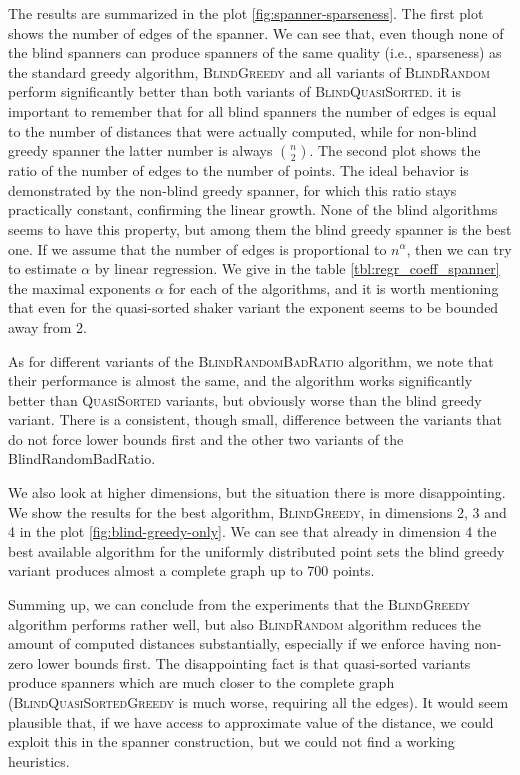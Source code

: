 \documentclass[a4paper,USenglish]{socg-lipics-v2018}
\begin{document}
The results are summarized in the plot \ref{fig:spanner-sparseness}.
The first plot shows the number of edges of the spanner.
We can see that, even though none of the blind spanners can produce
spanners of the same quality (i.e., sparseness) as the standard greedy algorithm,
\textsc{BlindGreedy} and all variants of \textsc{BlindRandom}
perform significantly better than both variants of \textsc{BlindQuasiSorted}.
it is important to remember that for all blind spanners the number of edges
is equal to the number of distances that were actually computed, while
for non-blind greedy spanner the latter number is always $n \choose 2$.
The second plot shows the ratio of the number of edges to the number of points.
The ideal behavior is demonstrated by the non-blind greedy spanner,
for which this ratio stays practically constant, confirming the linear growth.
None of the blind algorithms seems to have this property, but among them
the blind greedy spanner is the best one. If we assume that the number of edges
is proportional to $n^\alpha$, then we can try to estimate $\alpha$ by 
linear regression.  We give in the table \ref{tbl:regr_coeff_spanner}
the maximal exponents $\alpha$ for each of the algorithms,
and it is worth mentioning that even for the quasi-sorted shaker variant 
the exponent seems to be bounded away from 2.


As for different variants of the \textsc{BlindRandomBadRatio} algorithm,
we note that their performance is almost the same, and the algorithm works
significantly better than \textsc{QuasiSorted} variants, but obviously
worse than the blind greedy variant. There is a consistent, though small,
difference between the variants that do not force lower bounds first and
the other two variants of the BlindRandomBadRatio.


We also look at higher dimensions, but the situation there is more
disappointing. We show the results for the best algorithm, \textsc{BlindGreedy},
in dimensions 2, 3 and 4 in the plot \ref{fig:blind-greedy-only}.
We can see that already in dimension 4 the best available algorithm
for the uniformly distributed point sets the blind greedy variant
produces almost a complete graph up to 700 points.  


Summing up, we can conclude from the experiments that 
 the \textsc{BlindGreedy} algorithm performs rather well, but also \textsc{BlindRandom}
algorithm reduces the amount of computed distances substantially, especially if we enforce having non-zero lower bounds
first. The disappointing fact is that quasi-sorted variants produce spanners which are much closer to the complete graph
(\textsc{BlindQuasiSortedGreedy} is much worse, requiring all the edges). It would seem plausible that, if we have
access to approximate value of the distance, we could exploit this in the spanner construction, but we could not
find a working heuristics.
\end{document}
